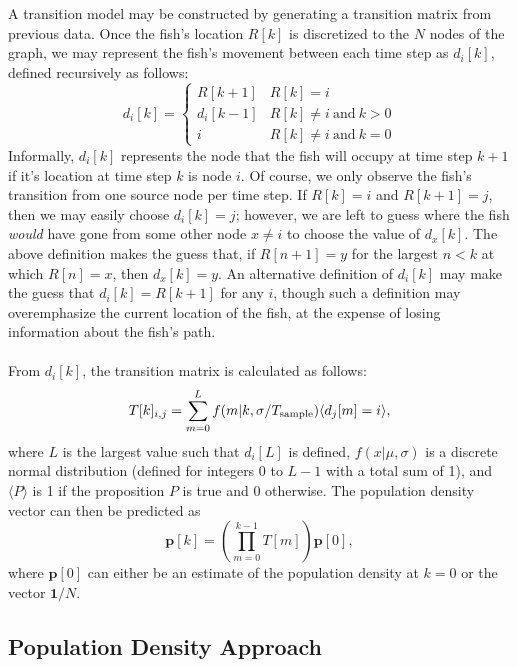 \documentclass[11pt,letterpaper]{article}
\begin{document}
	A transition model may be constructed by generating a transition matrix from previous data. Once the fish's location $R[k]$ is discretized to the $N$ nodes of the graph, we may represent the fish's movement between each time step as $d_i[k]$, defined recursively as follows:
	\[
	d_i[k] = \left\{
	\begin{array}{ll}
	R[k + 1] & R[k] = i \\
	d_i[k - 1] & R[k] \ne i ~\text{and}~ k > 0 \\
	i & R[k] \ne i ~\text{and}~ k = 0
	\end{array}
	\right.
	\] 
	Informally, $d_i[k]$ represents the node that the fish will occupy at time step $k + 1$ if it's location at time step $k$ is node $i$. Of course, we only observe the fish's transition from one source node per time step. If $R[k] = i$ and $R[k + 1] = j$, then we may easily choose $d_i[k] = j$; however, we are left to guess where the fish \textit{would} have gone from some other node $x \ne i$ to choose the value of $d_x[k]$. The above definition makes the guess that, if $R[n + 1] = y$ for the largest $n < k$ at which $R[n] = x$, then $d_x[k] = y$. An alternative definition of $d_i[k]$ may make the guess that $d_i[k] = R[k + 1]$ for any $i$, though such a definition may overemphasize the current location of the fish, at the expense of losing information about the fish's path.
	\\\\
	From $d_i[k]$, the transition matrix is calculated as follows:
	\[
	T[k]_{i, j} = \sum_{m = 0}^{L} f(m | k, \sigma / T_{\rm sample}) \langle d_j[m] = i \rangle,
	\]
	where $L$ is the largest value such that $d_i[L]$ is defined, $f(x | \mu, \sigma)$ is a discrete normal distribution (defined for integers 0 to $L - 1$ with a total sum of 1), and $\langle P \rangle$ is 1 if the proposition $P$ is true and 0 otherwise. The population density vector can then be predicted as
	\[
		\mathbf p[k] = \left( \prod_{m = 0}^{k - 1} T[m] \right) \mathbf p[0],
	\]
	where $\mathbf p[0]$ can either be an estimate of the population density at $k = 0$ or the vector $\mathbf 1 / N$.
	
	\subsection{Population Density Approach}
	
\end{document}
